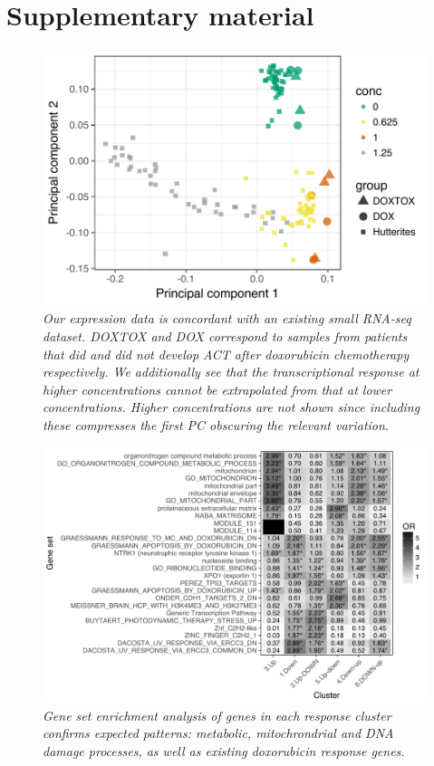 \documentclass{article}
\begin{document}
     
\clearpage

\setcounter{figure}{0}
\makeatletter 
\renewcommand{\thefigure}{S\@arabic\c@figure}

\section*{Supplementary material} 

\begin{figure}[h]
\begin{center}
    \includegraphics[width=.6\textwidth]{../figures/burridge_comparison.pdf} %
    \caption{\it{Our expression data is concordant with an existing small RNA-seq dataset\citep{Burridge2016}. DOXTOX and DOX correspond to samples from patients that did and did not develop ACT after doxorubicin chemotherapy respectively. We additionally see that the transcriptional response at higher concentrations cannot be extrapolated from that at lower concentrations. Higher concentrations are not shown since including these compresses the first PC obscuring the relevant variation.}}
    \label{fig:burridge}
    \end{center}
\end{figure}

\begin{figure}[h]
\begin{center}
    \includegraphics[width=1\textwidth]{../figures/cluster_go.pdf} %
    \caption{\it{Gene set enrichment analysis of genes in each response cluster confirms expected patterns: metabolic, mitochrondrial and DNA damage processes, as well as existing doxorubicin response genes.}}
    \label{fig:go}
    \end{center}
\end{figure}
\end{document}
